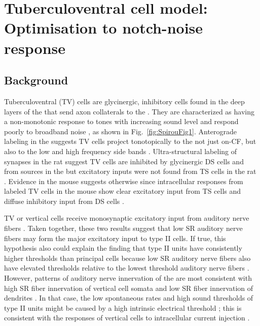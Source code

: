 
\section[TV Cell Model]{Tuberculoventral cell model: Optimisation to notch-noise response}
\label{sec:TV-cell-model}

\subsection{Background}

Tuberculoventral (TV) cells are glycinergic, inhibitory cells found in the deep
layers of the \DCN that send axon collaterals to the \VCN\@. They are
characterized as having a non-monotonic response to tones with increasing sound
level and respond poorly to broadband noise
\citep{SpirouDavisEtAl:1999,NelkenYoung:1997,ReissYoung:2005}, as shown in
Fig.~\ref{fig:SpirouFig1}.  Anterograde labeling in the \DCN suggests TV cells
project tonotopically to the \VCN not just on-CF, but also to the low and high
frequency side bands
\citep{MunirathinamOstapoffEtAl:2004,OstapoffMorestEtAl:1999}.  Ultra-structural
labeling of synapses in the rat \DCN suggest TV cells are inhibited by
glycinergic DS cells and from sources in the \DCN but excitatory inputs were not
found from TS cells in the rat \citep{Rubio:2005}. Evidence in the mouse
suggests otherwise since intracellular responses from labeled TV cells in the
mouse show clear excitatory input from TS cells and diffuse inhibitory input
from DS cells \citep{ZhangOertel:1993b,WickesbergOertel:1993}.


TV or vertical cells receive monosynaptic excitatory input from auditory nerve
ﬁbers \citep{OertelWu:1989,ZhangOertel:1993b}. Taken together, these two
results suggest that low SR auditory nerve ﬁbers may form the major excitatory
input to type II cells. If true, this hypothesis also could explain the ﬁnding
that type II units have consistently higher thresholds than \DCN principal cells
\citep{YoungBrownell:1976} because low SR auditory nerve ﬁbers also have
elevated thresholds relative to the lowest threshold auditory nerve ﬁbers
\citep{Liberman:1978}. However, patterns of auditory nerve innervation of the
\DCN are most consistent with high SR ﬁber innervation of vertical cell somata
and low SR ﬁber innervation of dendrites \citep{Liberman:1993}. In that case,
the low spontaneous rates and high sound thresholds of type II units might be
caused by a high intrinsic electrical threshold \citep{HancockDavisEtAl:1997};
this is consistent with the responses of vertical cells to intracellular current
injection \citep{DingVoigt:1997,ZhangOertel:1993b}.%


